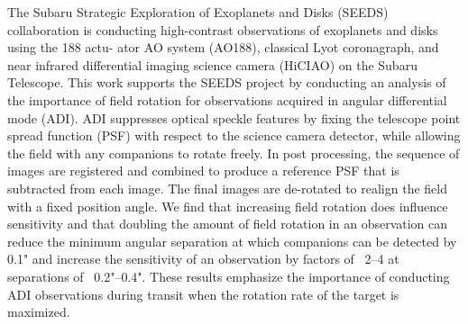 The Subaru Strategic Exploration of Exoplanets and Disks (SEEDS) collaboration is conducting high-contrast observations of exoplanets and disks using the 188 actu- ator AO system (AO188), classical Lyot coronagraph, and near infrared differential imaging science camera (HiCIAO) on the Subaru Telescope. This work supports the SEEDS project by conducting an analysis of the importance of field rotation for observations acquired in angular differential mode (ADI). ADI suppresses optical speckle features by fixing the telescope point spread function (PSF) with respect to the science camera detector, while allowing the field with any companions to rotate freely. In post processing, the sequence of images are registered and combined to produce a reference PSF that is subtracted from each image. The final images are de-rotated to realign the field with a fixed position angle. We find that increasing field rotation does influence sensitivity and that doubling the amount of field rotation in an observation can reduce the minimum angular separation at which companions can be detected by 0.1" and increase the sensitivity of an observation by factors of ~2–4 at separations of ~0.2"–0.4". These results emphasize the importance of conducting ADI observations during transit when the rotation rate of the target is maximized.
\newpage
